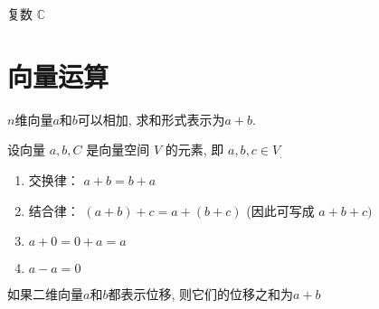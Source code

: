 \begin{example}
    复数 $ \mathbb{C} $
\end{example}

\section{向量运算}

\begin{definition}[向量加法]
    $n$维向量$a$和$b$可以相加, 求和形式表示为$a + b$.

    设向量 \( a, {b}, {C} \) 是向量空间 \( V \) 的元素, 即 \( a, {b}, {c} \in V_{\text {.  }} \)

\begin{enumerate}
    \item 交换律： \( a+b=b+a \)
    \item 结合律： \( (a+b)+c=a+(b+c) \) (因此可写成 \( a+{b}+{c}) \)
    \item \( a+0=0+a=a \)
    \item \( a-a=0 \)
\end{enumerate}
\end{definition}

\begin{corollary}[向量位移相加]
    如果二维向量$a$和$b$都表示位移, 则它们的位移之和为$a + b$
\end{corollary}

